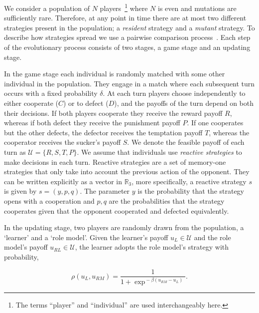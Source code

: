 \documentclass[11pt]{article}
\newcommand{\R}{\mathbb{R}}
\theoremstyle{plainCl1}
\theoremstyle{plainCl2}
\begin{document}
We consider a population of \(N\) players~\footnote{The terms ``player'' and
``individual'' are used interchangeably here.} where \(N\) is even and mutations
are sufficiently rare. Therefore, at any point in time there are at most two
different strategies present in the population; a \textit{resident} strategy and
a \textit{mutant} strategy. To describe how strategies spread we use a pairwise
comparison process~\cite{Traulsen2006}.
Each step of the evolutionary process consists of two
stages, a game stage and an updating stage.

In the game stage each individual is randomly matched with some other individual
in the population. They engage in a match where each subsequent turn
occurs with a fixed probability $\delta$. At each turn players choose independently to
either cooperate (\(C\)) or to defect (\(D\)), and the payoffs of the turn
depend on both their decisions. If both players cooperate they receive the
reward payoff \(R\), whereas if both defect they receive the punishment payoff
\(P\). If one cooperates but the other defects, the defector receives the
temptation payoff \(T\), whereas the cooperator receives the sucker's
payoff \(S\). We denote the feasible payoff of each turn as \(\mathcal{U} =
\{R, S, T, P\}\).
We assume that individuals use \textit{reactive strategies} to make
decisions in each turn. Reactive strategies are a set of memory-one strategies
that only take into account the previous action of the opponent. They can be
written explicitly as a vector in \(\R_{3}\), more specifically, a reactive
strategy \(s\) is given by \(s=(y, p, q)\). The parameter \(y\) is the probability that
the strategy opens with a cooperation and \(p, q\) are the probabilities that
the strategy cooperates given that the opponent cooperated and defected
equivalently.

In the updating stage, two players are randomly drawn from the population, a
`learner' and a `role model'. Given the learner's payoff $u_L\!\in\!
\mathcal{U}$ and the role model's payoff $u_{RL}\!\in\! \mathcal{U}$,
the learner adopts the role model's strategy with probability,

\begin{equation} \label{Eq:rho}
  \rho(u_{L}, u_{RM}) = \frac{1}{1\!+\! \exp^{\!-\!\beta (u_{RM}\!-\!u_{L})}}.
\end{equation}
\end{document}

